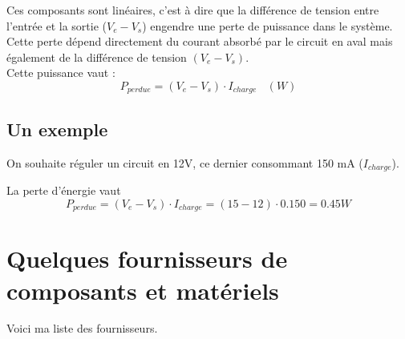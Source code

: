 
  Ces composants sont linéaires, c'est à dire que la différence de tension entre l'entrée et la sortie ($V_{e}-V_s$) engendre une perte de puissance dans le système.\\
  Cette perte dépend directement du courant absorbé par le circuit en aval mais également de la différence de tension $(V_e-V_s)$.\\
  Cette puissance vaut : $$ P_{perdue} =(V_e-V_s)\cdot I_{charge} ~~~~(W)$$

  \subsection{Un exemple}

  On souhaite réguler un circuit en 12V, ce dernier consommant 150 mA ($I_{charge}$).

  La perte d'énergie vaut $$ P_{perdue} =(V_e-V_s)\cdot I_{charge} =(15-12)\cdot 0.150 = 0.45 W$$





  \section{Quelques fournisseurs de composants et matériels}

  Voici ma liste des fournisseurs.

